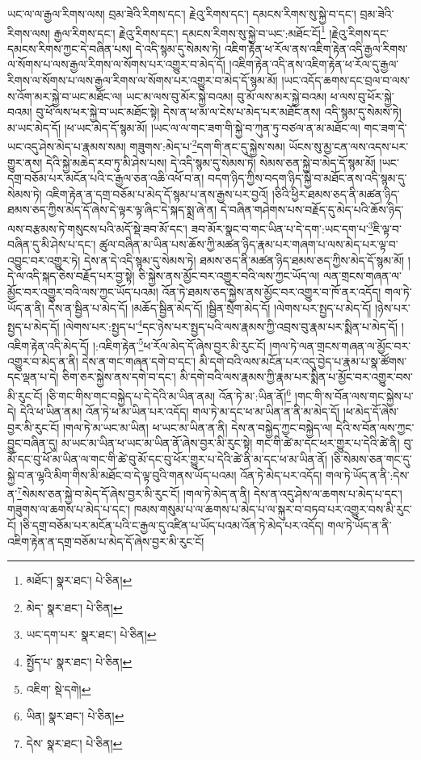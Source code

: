 ཡང་ལ་ལ་རྒྱལ་རིགས་ལས། བྲམ་ཟེའི་རིགས་དང་། རྗེའུ་རིགས་དང་། དམངས་རིགས་སུ་སྐྱེ་བ་དང་། བྲམ་ཟེའི་རིགས་ལས། རྒྱལ་རིགས་དང་། རྗེའུ་རིགས་དང་། དམངས་རིགས་སུ་སྐྱེ་བ་ཡང་:མཐོང་ངོ།\footnote{མཐོང་།  སྣར་ཐང་།  པེ་ཅིན། } །རྗེའུ་རིགས་དང་དམངས་རིགས་ཀྱང་དེ་བཞིན་པས། དེ་འདི་སྙམ་དུ་སེམས་ཏེ། འཇིག་རྟེན་ཕ་རོལ་ནས་འཇིག་རྟེན་འདི་རྒྱལ་རིགས་ལ་སོགས་པ་ལས་རྒྱལ་རིགས་ལ་སོགས་པར་འགྱུར་བ་མེད་དོ། །འཇིག་རྟེན་འདི་ནས་འཇིག་རྟེན་ཕ་རོལ་དུ་རྒྱལ་རིགས་ལ་སོགས་པ་ལས་རྒྱལ་རིགས་ལ་སོགས་པར་འགྱུར་བ་མེད་དོ་སྙམ་མོ། །ཡང་འདོད་ཆགས་དང་བྲལ་བ་ལས་ས་འོག་མར་སྐྱེ་བ་ཡང་མཐོང་ལ། ཡང་མ་ལས་བུ་མོར་སྐྱེ་བའམ། བུ་མོ་ལས་མར་སྐྱེ་བའམ། ཕ་ལས་བུ་ཕོར་སྐྱེ་བའམ། བུ་ཕོ་ལས་ཕར་སྐྱེ་བ་ཡང་མཐོང་སྟེ། དེས་ན་ཕ་མ་ལ་ངེས་པ་མེད་པར་མཐོང་ནས། འདི་སྙམ་དུ་སེམས་ཏེ། མ་ཡང་མེད་དོ། །ཕ་ཡང་མེད་དོ་སྙམ་མོ། །ཡང་ལ་ལ་གང་ཟག་གི་སྐྱེ་བ་ཀུན་ཏུ་བཙལ་ན་མ་མཐོང་ལ། གང་ཟག་དེ་ཡང་འདུ་ཤེས་མེད་པ་རྣམས་སམ། གཟུགས་:མེད་པ་\footnote{མེད་  སྣར་ཐང་།  པེ་ཅིན། }དག་གི་ནང་དུ་སྐྱེས་སམ། ཡོངས་སུ་མྱ་ངན་ལས་འདས་པར་གྱུར་ནས། དེའི་སྐྱེ་མཆེད་རབ་ཏུ་མི་ཤེས་པས། དེ་འདི་སྙམ་དུ་སེམས་ཏེ། སེམས་ཅན་སྐྱེ་བ་མེད་དོ་སྙམ་མོ། །ཡང་དགྲ་བཅོམ་པར་མངོན་པའི་ང་རྒྱལ་ཅན་འཆི་འཕོ་བ་ན། བདག་ཉིད་ཀྱིས་བདག་ཉིད་སྐྱེ་བ་མཐོང་ནས་འདི་སྙམ་དུ་སེམས་ཏེ། འཇིག་རྟེན་ན་དགྲ་བཅོམ་པ་མེད་དོ་སྙམ་པ་ནས་རྒྱས་པར་བྱའོ། །ཅིའི་ཕྱིར་ཐམས་ཅད་ནི་མཚན་ཉིད་ཐམས་ཅད་ཀྱིས་མེད་དོ་ཞེས་དེ་ལྟར་ལྟ་ཞིང་དེ་སྐད་སྨྲ་ཞེ་ན། དེ་བཞིན་གཤེགས་པས་བརྗོད་དུ་མེད་པའི་ཆོས་ཉིད་ལས་བརྩམས་ཏེ་གསུངས་པའི་མདོ་སྡེ་ཟབ་མོ་དང་། ཟབ་མོར་སྣང་བ་གང་ཡིན་པ་དེ་དག་:ཡང་དག་པ་\footnote{ཡང་དག་པར་  སྣར་ཐང་།  པེ་ཅིན། }ཇི་ལྟ་བ་བཞིན་དུ་མི་ཤེས་པ་དང་། ཚུལ་བཞིན་མ་ཡིན་པས་ཆོས་ཀྱི་མཚན་ཉིད་རྣམ་པར་གཞག་པ་ལས་མེད་པར་ལྟ་བ་འབྱུང་བར་འགྱུར་ཏེ། དེས་ན་དེ་འདི་སྙམ་དུ་སེམས་ཏེ། ཐམས་ཅད་ནི་མཚན་ཉིད་ཐམས་ཅད་ཀྱིས་མེད་དོ་སྙམ་མོ། །དེ་ལ་འདི་སྐད་ཅེས་བརྗོད་པར་བྱ་སྟེ། ཅི་སྐྱེས་ནས་མྱོང་བར་འགྱུར་བའི་ལས་ཀྱང་ཡོད་ལ། ལན་གྲངས་གཞན་ལ་མྱོང་བར་འགྱུར་བའི་ལས་ཀྱང་ཡོད་པའམ། འོན་ཏེ་ཐམས་ཅད་སྐྱེས་ནས་མྱོང་བར་འགྱུར་བ་ཁོ་ནར་འདོད། གལ་ཏེ་ཡོད་ན་ནི། དེས་ན་སྦྱིན་པ་མེད་དོ། །མཆོད་སྦྱིན་མེད་དོ། །སྦྱིན་སྲེག་མེད་དོ། །ལེགས་པར་སྤྱད་པ་མེད་དོ། །ཉེས་པར་སྤྱད་པ་མེད་དོ། །ལེགས་པར་:སྤྱད་པ་\footnote{སྤྱོད་པ་  སྣར་ཐང་།  པེ་ཅིན། }དང་ཉེས་པར་སྤྱད་པའི་ལས་རྣམས་ཀྱི་འབྲས་བུ་རྣམ་པར་སྨིན་པ་མེད་དོ། །འཇིག་རྟེན་འདི་མེད་དོ། །:འཇིག་རྟེན་\footnote{འཇིག་  སྡེ་དགེ། }ཕ་རོལ་མེད་དོ་ཞེས་བྱར་མི་རུང་ངོ། །གལ་ཏེ་ལན་གྲངས་གཞན་ལ་མྱོང་བར་འགྱུར་བ་མེད་ན་ནི། དེས་ན་གང་གཞན་དགེ་བ་དང་། མི་དགེ་བའི་ལས་མངོན་པར་འདུ་བྱེད་པ་རྣམ་པ་སྣ་ཚོགས་དང་ལྡན་པ་དེ། ཅིག་ཅར་སྐྱེས་ནས་དགེ་བ་དང་། མི་དགེ་བའི་ལས་རྣམས་ཀྱི་རྣམ་པར་སྨིན་པ་མྱོང་བར་འགྱུར་བས་མི་རུང་ངོ། །ཅི་གང་གིས་གང་བསྐྱེད་པ་དེ་དེའི་མ་ཡིན་ནམ། འོན་ཏེ་མ་:ཡིན་ནོ།\footnote{ཡིན།  སྣར་ཐང་།  པེ་ཅིན། } །གང་གི་ས་བོན་ལས་གང་སྐྱེས་པ་དེ། དེའི་ཕ་ཡིན་ནམ། འོན་ཏེ་ཕ་མ་ཡིན་པར་འདོད། གལ་ཏེ་མ་དང་ཕ་མ་ཡིན་ན་ནི་མ་མེད་དོ། །ཕ་མེད་དོ་ཞེས་བྱར་མི་རུང་ངོ། །གལ་ཏེ་མ་ཡང་མ་ཡིན། ཕ་ཡང་མ་ཡིན་ན་ནི། དེས་ན་བསྐྱེད་ཀྱང་བསྐྱེད་ལ། དེའི་ས་བོན་ལས་ཀྱང་བྱུང་བཞིན་དུ། མ་ཡང་མ་ཡིན་ཕ་ཡང་མ་ཡིན་ནོ་ཞེས་བྱར་མི་རུང་སྟེ། གང་གི་ཚེ་མ་དང་ཕར་གྱུར་པ་དེའི་ཚེ་ནི། བུ་མོ་དང་བུ་ཕོ་མ་ཡིན་ལ་གང་གི་ཚེ་བུ་མོ་དང་བུ་ཕོར་གྱུར་པ་དེའི་ཚེ་ནི་མ་དང་ཕ་མ་ཡིན་ནོ། །ཅི་སེམས་ཅན་གང་དུ་སྐྱེ་བ་ན་ལྷའི་མིག་གིས་མི་མཐོང་བ་དེ་ལྟ་བུའི་གནས་ཡོད་པའམ། འོན་ཏེ་མེད་པར་འདོད། གལ་ཏེ་ཡོད་ན་ནི་:དེས་ན་\footnote{དེས་  སྣར་ཐང་།  པེ་ཅིན། }སེམས་ཅན་སྐྱེ་བ་མེད་དོ་ཞེས་བྱར་མི་རུང་ངོ། །གལ་ཏེ་མེད་ན་ནི། དེས་ན་འདུ་ཤེས་ལ་ཆགས་པ་མེད་པ་དང་། གཟུགས་ལ་ཆགས་པ་མེད་པ་དང་། ཁམས་གསུམ་པ་ལ་ཆགས་པ་མེད་པ་ལ་སྐུར་བ་བཏབ་པར་འགྱུར་བས་མི་རུང་ངོ། །ཅི་དགྲ་བཅོམ་པར་མངོན་པའི་ང་རྒྱལ་དུ་འཛིན་པ་ཡོད་པའམ་འོན་ཏེ་མེད་པར་འདོད། གལ་ཏེ་ཡོད་ན་ནི་འཇིག་རྟེན་ན་དགྲ་བཅོམ་པ་མེད་དོ་ཞེས་བྱར་མི་རུང་ངོ། 